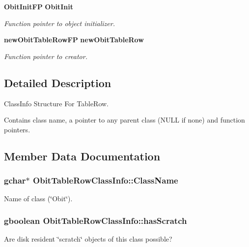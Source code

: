 \begin{CompactItemize}
{\bf Obit\-Init\-FP} {\bf Obit\-Init}
\begin{CompactList}\small\item\em Function pointer to object initializer. \item\end{CompactList}\item 
{\bf new\-Obit\-Table\-Row\-FP} {\bf new\-Obit\-Table\-Row}
\begin{CompactList}\small\item\em Function pointer to creator. \item\end{CompactList}\end{CompactItemize}


\subsection{Detailed Description}
Class\-Info Structure For Table\-Row. 

Contains class name, a pointer to any parent class (NULL if none) and function pointers. 



\subsection{Member Data Documentation}
\subsubsection{\setlength{\rightskip}{0pt plus 5cm}gchar$\ast$ {\bf Obit\-Table\-Row\-Class\-Info::Class\-Name}}\label{structObitTableRowClassInfo_o2}


Name of class (\char`\"{}Obit\char`\"{}). 

\subsubsection{\setlength{\rightskip}{0pt plus 5cm}gboolean {\bf Obit\-Table\-Row\-Class\-Info::has\-Scratch}}\label{structObitTableRowClassInfo_o1}


Are disk resident \char`\"{}scratch\char`\"{} objects of this class possible? 

